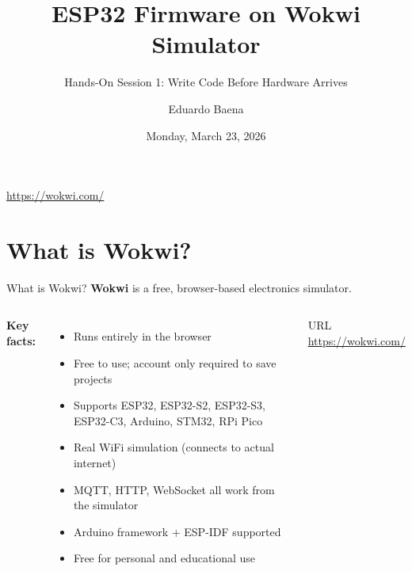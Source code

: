 \documentclass[aspectratio=169,11pt]{beamer}
\title[EECE5155 -- Hands-On 1]{ESP32 Firmware on Wokwi Simulator}
\subtitle{Hands-On Session 1: Write Code Before Hardware Arrives}
\author{Eduardo Baena}
\date{Monday, March 23, 2026}
\institute{Northeastern University\\EECE5155: Wireless Sensor Networks and IoT}
\begin{document}
\begin{frame}
    \titlepage
    \vspace{-0.8cm}
    \begin{center}
        {\small \url{https://wokwi.com/}}
    \end{center}
\end{frame}

\section{What is Wokwi?}

\begin{frame}{What is Wokwi?}
    \textbf{Wokwi} is a free, browser-based electronics simulator.

    \vspace{0.2cm}
    \begin{columns}
        \textbf{Key facts:}
        \begin{itemize}
            \item Runs entirely in the browser
            \item Free to use; account only required to save projects
            \item Supports ESP32, ESP32-S2, ESP32-S3, ESP32-C3, Arduino, STM32, RPi Pico
            \item Real WiFi simulation (connects to actual internet)
            \item MQTT, HTTP, WebSocket all work from the simulator
            \item Arduino framework + ESP-IDF supported
            \item Free for personal and educational use
        \end{itemize}


        \vspace{0.2cm}
        \begin{block}{URL}
            \centering
            \url{https://wokwi.com/}
        \end{block}
    \end{columns}
\end{frame}
\end{document}

